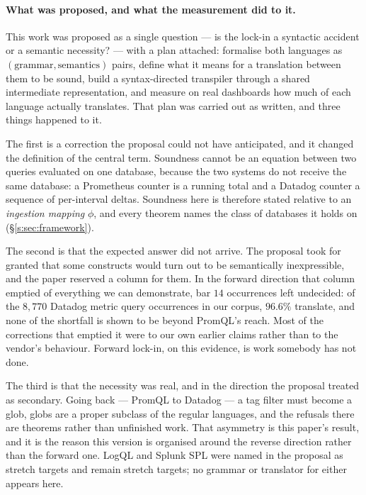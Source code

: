 \paragraph{What was proposed, and what the measurement did to it.}
This work was proposed as a single question --- is the lock-in a syntactic accident or a
semantic necessity? --- with a plan attached: formalise both languages as
$(\text{grammar},\text{semantics})$ pairs, define what it means for a translation between
them to be sound, build a syntax-directed transpiler through a shared intermediate
representation, and measure on real dashboards how much of each language actually
translates. That plan was carried out as written, and three things happened to it.

The first is a correction the proposal could not have anticipated, and it changed the
definition of the central term. Soundness cannot be an equation between two queries
evaluated on one database, because the two systems do not receive the same database: a
Prometheus counter is a running total and a Datadog counter a sequence of per-interval
deltas. Soundness here is therefore stated relative to an \emph{ingestion mapping}
$\phi$, and every theorem names the class of databases it holds on
(\S\ref{s:sec:framework}).

The second is that the expected answer did not arrive. The proposal took for granted that
some constructs would turn out to be semantically inexpressible, and the paper reserved a
column for them. In the forward direction that column emptied of everything we can
demonstrate, bar $14$ occurrences left undecided: of the $8{,}770$ Datadog metric query
occurrences in our corpus, $96.6\%$ translate, and none of the shortfall is shown to be
beyond PromQL's reach. Most of the
corrections that emptied it were to our own earlier claims rather than to the vendor's
behaviour. Forward lock-in, on this evidence, is work somebody has not done.

The third is that the necessity was real, and in the direction the proposal treated as
secondary. Going back --- PromQL to Datadog --- a tag filter must become a glob, globs
are a proper subclass of the regular languages, and the refusals there are theorems
rather than unfinished work. That asymmetry is this paper's result, and it is the reason
this version is organised around the reverse direction rather than the forward one.
LogQL and Splunk SPL were named in the proposal as stretch targets and remain stretch
targets; no grammar or translator for either appears here.

